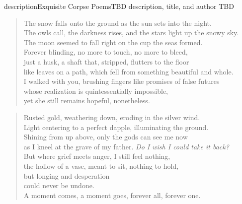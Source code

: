 
\begin{prose}{description}{Exquisite Corpse Poems}{TBD}
    \LARGE description, title, and author TBD
\end{prose}

\clearpage
\setauthor{}

\begin{verse}
    The snow falls onto the ground as the sun sets into the night.\\
    The owls call, the darkness rises, and the stars light up the snowy sky.\\
    The moon seemed to fall right on the cup the seas formed.\\
    Forever blinding, no more to touch, no more to bleed,\\
    just a husk, a shaft that, stripped, flutters to the floor\\
    like leaves on a path, which fell from something beautiful and whole.\\ 
    I walked with you, brushing fingers like promises of false futures\\
    whose realization is quintessentially impossible,\\
    yet she still remains hopeful, nonetheless.\\    
\end{verse}

\vfill

\begin{verse}
    Rusted gold, weathering down, eroding in the silver wind.\\
    Light centering to a perfect dapple, illuminating the ground.\\
    Shining from up above, only the gods can see me now\\
    as I kneel at the grave of my father. \textit{Do I wish I could take it back?}\\
    But where grief meets anger, I still feel nothing,\\
    the hollow of a vase, meant to sit, nothing to hold,\\
    but longing and desperation\\
    could never be undone.\\
    A moment comes, a moment goes, forever all, forever one.\\    
\end{verse}


